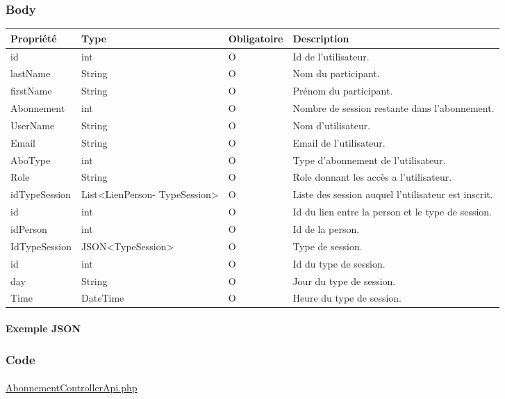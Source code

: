 	\subsubsection{Body}
		\begin{center}
			\begin{tabularx}{\textwidth}{| T{0.2122\textwidth} | S{0.22\textwidth} | S{0.15\textwidth} | S{0.3\textwidth} |}
				\hline
				Propriété & Type & Obligatoire & Description \\
				\hline
				id & int & O & Id de l'utilisateur. \\
				\hline
				lastName & String & O & Nom du participant. \\
				\hline
				firstName & String & O & Prénom du participant. \\
				\hline
				Abonnement & int & O & Nombre de session restante dans l'abonnement. \\
				\hline
				UserName & String & O & Nom d'utilisateur. \\
				\hline
				Email & String & O & Email de l'utilisateur. \\
				\hline
				AboType & int & O & Type d'abonnement de l'utilisateur. \\
				\hline
				Role & String & O & Role donnant les accès a l'utilisateur. \\ 
				\hline
				idTypeSession & List<LienPerson- TypeSession> & O & Liste des session auquel l'utilisateur est inscrit. \\
				\hline
				
				\hline
				
				\hline
				id & int & O & Id du lien entre la person et le type de session. \\ 
				\hline
				idPerson & int & O & Id de la person. \\
				\hline
				IdTypeSession & JSON<TypeSession> & O & Type de session. \\
				\hline
				
				\hline
				
				\hline
				id & int & O & Id du type de session. \\
				\hline
				day & String & O & Jour du type de session. \\
				\hline
				Time & DateTime & O & Heure du type de session. \\
				\hline

			\end{tabularx}
		\end{center}
		
	\newpage
		\paragraph{Exemple JSON}
			\paragraph{}
			
			
			
	\subsubsection{Code}
		\paragraph{}
			\href{https://github.com/victorsmits/Aquabike/blob/master/backend/src/Controller/API/AbonnementControllerApi.php}{AbonnementControllerApi.php}